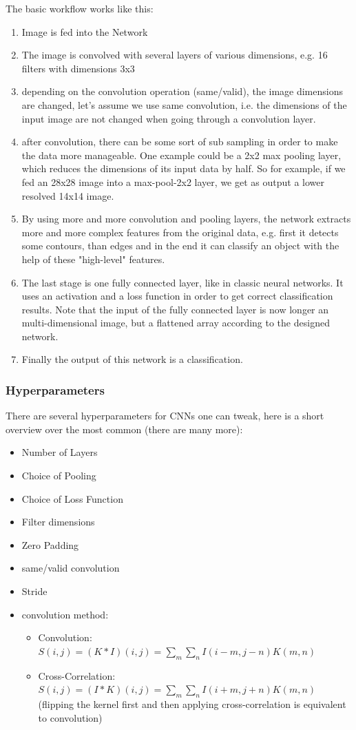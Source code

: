 \documentclass[paper=a4, fontsize=11pt]{scrartcl} %
\numberwithin{equation}{section} %
\numberwithin{figure}{section} %
\numberwithin{table}{section} %
\begin{document}
The basic workflow works like this:
\begin{enumerate}
	\setlength\itemsep{0em}
	\item Image is fed into the Network
	\item The image is convolved with several layers of various dimensions, e.g. 16 filters with dimensions 3x3
	\item depending on the convolution operation (same/valid), the image dimensions are changed, let's assume we use same convolution, i.e. the dimensions of the input image are not changed when going through a convolution layer.
	\item after convolution, there can be some sort of sub sampling in order to make the data more manageable. One example could be a 2x2 max pooling layer, which reduces the dimensions of its input data by half. So for example, if we fed an 28x28 image into a max-pool-2x2 layer, we get as output a lower resolved 14x14 image.
	\item By using more and more convolution and pooling layers, the network extracts more and more complex features from the original data, e.g. first it detects some contours, than edges and in the end it can classify an object with the help of these "high-level" features.
	\item The last stage is one fully connected layer, like in classic neural networks. It uses an activation and a loss function in order to get correct classification results. Note that the input of the fully connected layer is now longer an multi-dimensional image, but a flattened array according to the designed network.
	\item Finally the output of this network is a classification. 
\end{enumerate}

\subsubsection{Hyperparameters}
There are several hyperparameters for CNNs one can tweak, here is a short overview over the most common (there are many more):
\begin{itemize}
	\item Number of Layers
	\item Choice of Pooling
	\item Choice of Loss Function
	\item Filter dimensions
	\item Zero Padding
	\item same/valid convolution
	\item Stride
	\item convolution method:
	\begin{itemize}
		\item Convolution: $S(i,j) = (K \ast I)(i,j) = \sum \limits _m \sum \limits _n I(i-m,j-n)K(m,n)$
		\item Cross-Correlation: $S(i,j) = (I \ast K)(i,j) = \sum \limits _m \sum \limits _n I(i+m,j+n)K(m,n)$\\(flipping the kernel first and then applying cross-correlation is equivalent to convolution)
	\end{itemize}
\end{itemize}
\end{document}
